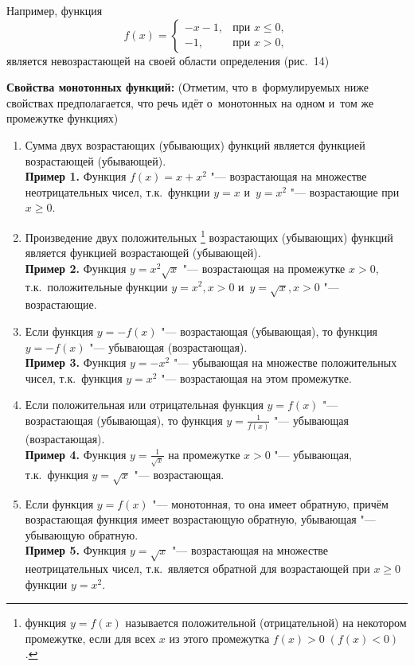 Например, функция
\begin{equation*}
f(x) = 
\begin{cases}
-x - 1, & \text{при $x \leqslant 0$}, \\
-1, & \text{при $x > 0$},
\end{cases}
\end{equation*}
является невозрастающей на своей области определения (рис.\ 14)

\textbf{Свойства монотонных функций:}
(Отметим, что в~формулируемых ниже свойствах предполагается,
что речь идёт о~монотонных на одном и~том же промежутке функциях)
\begin{enumerate}
\item Сумма двух возрастающих (убывающих) функций является функцией
возрастающей (убывающей).\\
\textbf{Пример 1.} Функция $f(x) = x + x^{2}$ "--- возрастающая
на множестве неотрицательных чисел, т.к.\ функции $y = x$ и~$y = x^{2}$
"--- возрастающие при $x \geqslant 0$.

\item Произведение двух положительных
\footnote{функция $y = f(x)$ называется положительной (отрицательной)
на некотором промежутке, если для всех $x$ из этого промежутка
$f(x) > 0 \; (f(x) < 0)$.}
возрастающих (убывающих) функций является функцией возрастающей
(убывающей). \\
\textbf{Пример 2.} Функция $y = x^{2}\sqrt{x}$ "--- возрастающая
на промежутке $x > 0$, т.к.\ положительные функции $y = x^{2}, x > 0$
и~$y = \sqrt{x}, x > 0$ "--- возрастающие.

\item Если функция $y = -f(x)$ "--- возрастающая (убывающая),
то функция $y = -f(x)$ "--- убывающая (возрастающая). \\
\textbf{Пример 3.} Функция $y = -x^{2}$ "--- убывающая на множестве
положительных чисел, т.к.\ функция $y = x^{2}$ "--- возрастающая
на этом промежутке.

\item Если положительная или отрицательная функция $y = f(x)$
"--- возрастающая (убывающая), то функция
$\displaystyle y = \frac{1}{f(x)}$ "--- убывающая (возрастающая). \\
\textbf{Пример 4.} Функция $\displaystyle y = \frac{1}{\sqrt{x}}$
на промежутке $x > 0$ "--- убывающая, т.к.\ функция $y = \sqrt{x}$
"--- возрастающая.

\item Если функция $y = f(x)$ "--- монотонная, то она имеет обратную,
причём возрастающая функция имеет возрастающую обратную,
убывающая "--- убывающую обратную. \\
\textbf{Пример 5.} Функция $y = \sqrt{x}$ "--- возрастающая на множестве
неотрицательных чисел, т.к.\ является обратной для возрастающей
при $x \geqslant 0$ функции $y = x^{2}$.


\end{enumerate}
